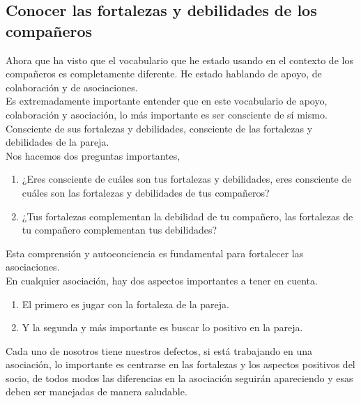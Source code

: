 \documentclass[10pt]{book}
\begin{document}
\subsection{Conocer las fortalezas y debilidades de los compañeros}
Ahora que ha visto que el vocabulario que he estado usando en el contexto de los compañeros es completamente diferente. He estado hablando de apoyo, de colaboración y de asociaciones.\\
Es extremadamente importante entender que en este vocabulario de apoyo, colaboración y asociación, lo más importante es ser consciente de sí mismo. Consciente de sus fortalezas y debilidades, consciente de las fortalezas y debilidades de la pareja.\\
Nos hacemos dos preguntas importantes,
\begin{enumerate}[\bfseries I.]
\item ¿Eres consciente de cuáles son tus fortalezas y debilidades, eres consciente de cuáles son las fortalezas y debilidades de tus compañeros?
\item ¿Tus fortalezas complementan la debilidad de tu compañero, las fortalezas de tu compañero complementan tus debilidades?
\end{enumerate}
Esta comprensión y autoconciencia es fundamental para fortalecer las asociaciones.\\
En cualquier asociación, hay dos aspectos importantes a tener en cuenta.
\begin{enumerate}[\bfseries I.]
\item El primero es jugar con la fortaleza de la pareja.
\item Y la segunda y más importante es buscar lo positivo en la pareja.
\end{enumerate}
Cada uno de nosotros tiene nuestros defectos, si está trabajando en una asociación, lo importante es centrarse en las fortalezas y los aspectos positivos del socio, de todos modos las diferencias en la asociación seguirán apareciendo y esas deben ser manejadas de manera saludable.
\end{document}
